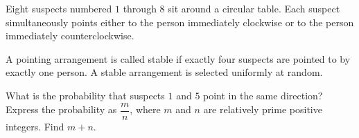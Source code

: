Eight suspects numbered $1$ through $8$ sit around a circular table. Each suspect simultaneously points either to the person immediately clockwise or to the person immediately counterclockwise.

A pointing arrangement is called stable if exactly four suspects are pointed to by exactly one person. A stable arrangement is selected uniformly at random.

What is the probability that suspects $1$ and $5$ point in the same direction? Express the probability as $\dfrac{m}{n}$, where $m$ and $n$ are relatively prime positive integers. Find $m+n.$

